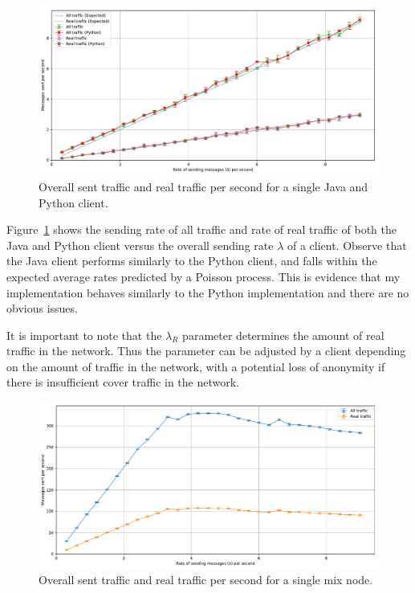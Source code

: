 \documentclass[final,dissertation.tex]{subfiles}
\begin{document}
\begin{figure}[h]
	\includegraphics[width=\linewidth]{../figs/client_bandwidth}
	\caption{Overall sent traffic and real traffic per second for a single Java and Python client.}
	\label{fig:client_bandwidth}
\end{figure}

Figure~\ref{fig:client_bandwidth} shows the sending rate of all traffic and rate of real traffic of both the Java and Python client versus the overall sending rate $\lambda$ of a client. Observe that the Java client performs similarly to the Python client, and falls within the expected average rates predicted by a Poisson process. This is evidence that my implementation behaves similarly to the Python implementation and there are no obvious issues.

It is important to note that the $\lambda_R$ parameter determines the amount of real traffic in the network. Thus the parameter can be adjusted by a client depending on the amount of traffic in the network, with a potential loss of anonymity if there is insufficient cover traffic in the network.

\begin{figure}[h]
	\includegraphics[width=\linewidth]{../figs/mix_bandwidth}
	\caption{Overall sent traffic and real traffic per second for a single mix node.}
	\label{fig:mix_bandwidth}
\end{figure}
\end{document}

